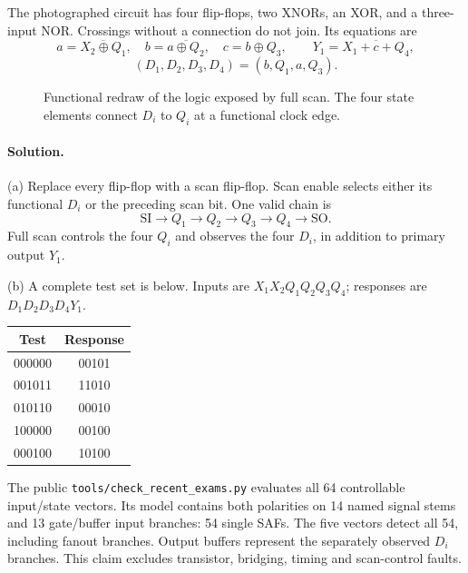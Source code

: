 \documentclass[11pt,a4paper]{article}
\newcommand{\sol}{\paragraph{Solution.}}
\begin{document}
The photographed circuit has four flip-flops, two XNORs, an XOR, and a three-input NOR. Crossings without a connection do not join. Its equations are
\[
 a=\overline{X_2\oplus Q_1},\quad b=\overline{a\oplus Q_2},\quad c=b\oplus Q_3,
\qquad Y_1=\overline{X_1+c+Q_4},
\]
\[
 (D_1,D_2,D_3,D_4)=(b,Q_1,a,Q_3).
\]
\begin{figure}[ht]\centering
{}
\caption{Functional redraw of the logic exposed by full scan. The four state elements connect $D_i$ to $Q_i$ at a functional clock edge.}
\end{figure}
\sol (a) Replace every flip-flop with a scan flip-flop. Scan enable selects either its functional $D_i$ or the preceding scan bit. One valid chain is
\[
 \mathrm{SI}\to Q_1\to Q_2\to Q_3\to Q_4\to\mathrm{SO}.
\]
Full scan controls the four $Q_i$ and observes the four $D_i$, in addition to primary output $Y_1$.

(b) A complete test set is below. Inputs are $X_1X_2Q_1Q_2Q_3Q_4$; responses are $D_1D_2D_3D_4Y_1$.
\begin{center}\begin{tabular}{cc}\toprule Test&Response\\\midrule
000000&00101\\001011&11010\\010110&00010\\100000&00100\\000100&10100\\\bottomrule
\end{tabular}\end{center}
The public \texttt{tools/check\_recent\_exams.py} evaluates all 64 controllable input/state vectors. Its model contains both polarities on 14 named signal stems and 13 gate/buffer input branches: 54 single SAFs. The five vectors detect all 54, including fanout branches. Output buffers represent the separately observed $D_i$ branches. This claim excludes transistor, bridging, timing and scan-control faults.
\end{document}
